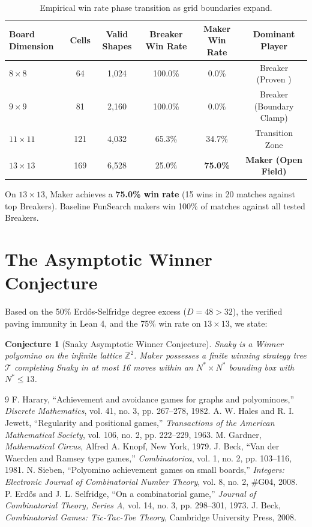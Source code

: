 \documentclass[11pt,a4paper]{article}
\newtheorem{conjecture}[theorem]{Conjecture}
\begin{document}
\begin{table}[h]
\centering
\begin{tabular}{lccccc}
\toprule
\textbf{Board Dimension} & \textbf{Cells} & \textbf{Valid Shapes} & \textbf{Breaker Win Rate} & \textbf{Maker Win Rate} & \textbf{Dominant Player} \\
\midrule
$8 \times 8$   & 64  & 1,024 & 100.0\% & 0.0\%  & Breaker (Proven \cite{sieben2008}) \\
$9 \times 9$   & 81  & 2,160 & 100.0\% & 0.0\%  & Breaker (Boundary Clamp) \\
$11 \times 11$ & 121 & 4,032 & 65.3\%  & 34.7\% & Transition Zone \\
$13 \times 13$ & 169 & 6,528 & 25.0\%  & \textbf{75.0\%} & \textbf{Maker (Open Field)} \\
\bottomrule
\end{tabular}
\caption{Empirical win rate phase transition as grid boundaries expand.}
\end{table}

On $13 \times 13$, Maker achieves a \textbf{75.0\% win rate} (15 wins in 20 matches against top Breakers). Baseline FunSearch makers win 100\% of matches against all tested Breakers.

\section{The Asymptotic Winner Conjecture}

Based on the 50\% Erd\H{o}s-Selfridge degree excess ($D=48 > 32$), the verified paving immunity in Lean 4, and the 75\% win rate on $13 \times 13$, we state:

\begin{conjecture}[Snaky Asymptotic Winner Conjecture]
Snaky is a Winner polyomino on the infinite lattice $\mathbb{Z}^2$. Maker possesses a finite winning strategy tree $\mathcal{T}$ completing Snaky in at most 16 moves within an $N^* \times N^*$ bounding box with $N^* \le 13$.
\end{conjecture}

\begin{thebibliography}{9}
 F. Harary, ``Achievement and avoidance games for graphs and polyominoes,'' \emph{Discrete Mathematics}, vol. 41, no. 3, pp. 267--278, 1982.
 A. W. Hales and R. I. Jewett, ``Regularity and positional games,'' \emph{Transactions of the American Mathematical Society}, vol. 106, no. 2, pp. 222--229, 1963.
 M. Gardner, \emph{Mathematical Circus}, Alfred A. Knopf, New York, 1979.
 J. Beck, ``Van der Waerden and Ramsey type games,'' \emph{Combinatorica}, vol. 1, no. 2, pp. 103--116, 1981.
 N. Sieben, ``Polyomino achievement games on small boards,'' \emph{Integers: Electronic Journal of Combinatorial Number Theory}, vol. 8, no. 2, \#G04, 2008.
 P. Erd\H{o}s and J. L. Selfridge, ``On a combinatorial game,'' \emph{Journal of Combinatorial Theory, Series A}, vol. 14, no. 3, pp. 298--301, 1973.
 J. Beck, \emph{Combinatorial Games: Tic-Tac-Toe Theory}, Cambridge University Press, 2008.
\end{thebibliography}
\end{document}
